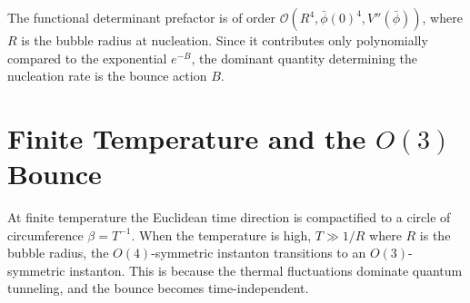
The functional determinant prefactor is of order
$\mathcal{O}(R^4, \bar\phi(0)^4, V''(\bar\phi))$, where $R$ is the
bubble radius at nucleation. Since it contributes only polynomially
compared to the exponential $e^{-B}$, the dominant quantity
determining the nucleation rate is the bounce action $B$.

\section{Finite Temperature and the \texorpdfstring{$O(3)$}{O(3)}
Bounce}

At finite temperature the Euclidean time direction is compactified to
a circle of circumference $\beta = T^{-1}$. When the temperature is
high, $T\gg 1/R$ where $R$ is the bubble radius, the $O(4)$-symmetric
instanton transitions to an $O(3)$-symmetric instanton. This is
because the thermal fluctuations dominate quantum tunneling, and the
bounce becomes time-independent.


